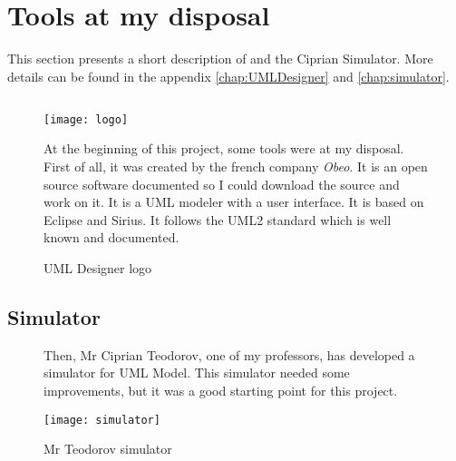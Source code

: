 







\section{Tools at my disposal}

This section presents a short description of \umld and the Ciprian Simulator. More details can be found in the appendix \ref{chap:UMLDesigner} and \ref{chap:simulator}.
\newpage
\subsection{\umld}
\begin{figure}[!h]
  \begin{minipage}[h]{0.45\linewidth}
    \centering
    \texttt{[image: logo]}
    \caption{UML Designer logo}
    \label{fig:logo}
  \end{minipage}\hfill
  \begin{minipage}[h]{0.45\linewidth}

    At the beginning of this project, some tools were at my disposal. First of all, it was \umld created by the french company \textit{Obeo}. It is an open source software documented so I could download the source and work on it. It is a UML modeler with a user interface. It is based on Eclipse and Sirius. It follows the UML2 standard which is well known and documented.

  \end{minipage}
\end{figure}


\subsection{Simulator}
\begin{figure}[!h]
  \begin{minipage}[h]{0.45\linewidth}

    Then, Mr Ciprian Teodorov, one of my professors, has developed a simulator for UML Model. This simulator needed some improvements, but it was a good starting point for this project.

  \end{minipage}\hfill
  \begin{minipage}[h]{0.45\linewidth}
    \centering
    \texttt{[image: simulator]}
    \caption{Mr Teodorov simulator}
    \label{fig:sim}
  \end{minipage}
\end{figure}







